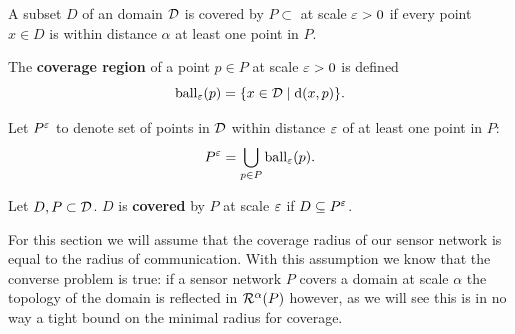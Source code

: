A subset $D$ of an domain ${\mathcal{D}}$ is covered by $P\subset$ at scale $\varepsilon > 0$ if every point $x\in D$ is within distance $\alpha$ at least one point in $P$.
\begin{definition}
    The \textbf{coverage region} of a point $p\in P$ at scale $\varepsilon > 0$ is defined
    \[\mathrm{ball}_\varepsilon(p) = \{x\in{\mathcal{D}}\mid \mathrm{d}(x, p)\}.\]
\end{definition}
Let $P^\varepsilon$ to denote set of points in ${\mathcal{D}}$ within distance $\varepsilon$ of at least one point in $P$:
\[ P^\varepsilon = \bigcup_{p\in P}\mathrm{ball}_\varepsilon(p). \]
\begin{definition}
    Let $D, P\subset{\mathcal{D}}$.
    $D$ is \textbf{covered} by $P$ at scale $\varepsilon$ if $D\subseteq P^\varepsilon$.
\end{definition}
For this section we will assume that the coverage radius of our sensor network is equal to the radius of communication.
With this assumption we know that the converse problem is true: if a sensor network $P$ covers a domain at scale $\alpha$ the topology of the domain is reflected in $\mathcal{R}^\alpha(P)$ however, as we will see this is in no way a tight bound on the minimal radius for coverage.

